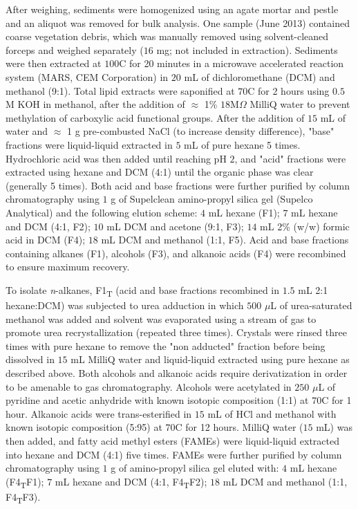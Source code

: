 After weighing, sediments were homogenized using an agate mortar and pestle and an aliquot was removed for bulk analysis. One sample (June 2013) contained coarse vegetation debris, which was manually removed using solvent-cleaned forceps and weighed separately ($16$ mg; not included in extraction). Sediments were then extracted at $100$\textdegree C for 20 minutes in a microwave accelerated reaction system (MARS, CEM Corporation) in $20$ mL of dichloromethane (DCM) and methanol (9:1). Total lipid extracts were saponified at $70$\textdegree C for 2 hours using $0.5$ M KOH in methanol, after the addition of $\approx$ 1\% $18$M$\Omega$ MilliQ water to prevent methylation of carboxylic acid functional groups. After the addition of $15$ mL of water and $\approx$ 1 g pre-combusted NaCl (to increase density difference), "base" fractions were liquid-liquid extracted in $5$ mL of pure hexane 5 times. Hydrochloric acid was then added until reaching pH $2$, and "acid" fractions were extracted using hexane and DCM (4:1) until the organic phase was clear (generally 5 times). Both acid and base fractions were further purified by column chromatography using $1$ g of Supelclean amino-propyl silica gel (Supelco Analytical) and the following elution scheme: $4$ mL hexane (F1); $7$ mL hexane and DCM (4:1, F2); $10$ mL DCM and acetone (9:1, F3); $14$ mL 2\% (w/w) formic acid in DCM (F4); $18$ mL DCM and methanol (1:1, F5). Acid and base fractions containing alkanes (F1), alcohols (F3), and alkanoic acids (F4) were recombined to ensure maximum recovery.

To isolate \textit{n}-alkanes, F1\textsubscript{T} (acid and base fractions recombined in $1.5$ mL 2:1 hexane:DCM) was subjected to urea adduction in which $500$ $\mu$L of urea-saturated methanol was added and solvent was evaporated using a stream of  gas to promote urea recrystallization (repeated three times). Crystals were rinsed three times with pure hexane to remove the "non adducted" fraction before being dissolved in $15$ mL MilliQ water and liquid-liquid extracted using pure hexane as described above. Both alcohols and alkanoic acids require derivatization in order to be amenable to gas chromatography. Alcohols were acetylated in $250$ $\mu$L of pyridine and acetic anhydride with known isotopic composition (1:1) at $70$\textdegree C for 1 hour. Alkanoic acids were trans-esterified in $15$ mL of HCl and methanol with known isotopic composition (5:95) at $70$\textdegree C for 12 hours. MilliQ water ($15$ mL) was then added, and fatty acid methyl esters (FAMEs) were liquid-liquid extracted into hexane and DCM (4:1) five times. FAMEs were further purified by column chromatography using $1$ g of amino-propyl silica gel eluted with: $4$ mL hexane (F4\textsubscript{T}F1); $7$ mL hexane and DCM (4:1, F4\textsubscript{T}F2); $18$ mL DCM and methanol (1:1, F4\textsubscript{T}F3).

